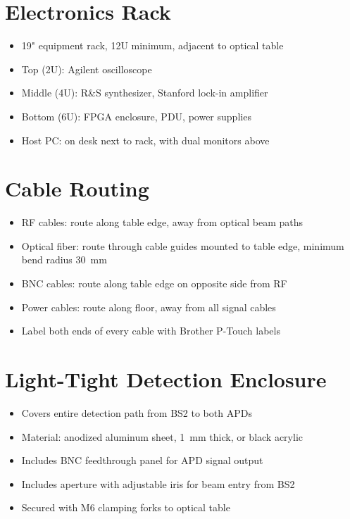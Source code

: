 \documentclass[11pt,a4paper,openany]{book}
\begin{document}
\section{Electronics Rack}

\begin{itemize}[nosep]
  \item 19" equipment rack, 12U minimum, adjacent to optical table
  \item Top (2U): Agilent oscilloscope
  \item Middle (4U): R\&S synthesizer, Stanford lock-in amplifier
  \item Bottom (6U): FPGA enclosure, PDU, power supplies
  \item Host PC: on desk next to rack, with dual monitors above
\end{itemize}

\section{Cable Routing}

\begin{itemize}[nosep]
  \item RF cables: route along table edge, away from optical beam paths
  \item Optical fiber: route through cable guides mounted to table edge, minimum bend radius 30~mm
  \item BNC cables: route along table edge on opposite side from RF
  \item Power cables: route along floor, away from all signal cables
  \item Label both ends of every cable with Brother P-Touch labels
\end{itemize}

\section{Light-Tight Detection Enclosure}

\begin{itemize}[nosep]
  \item Covers entire detection path from BS2 to both APDs
  \item Material: anodized aluminum sheet, 1~mm thick, or black acrylic
  \item Includes BNC feedthrough panel for APD signal output
  \item Includes aperture with adjustable iris for beam entry from BS2
  \item Secured with M6 clamping forks to optical table
\end{itemize}
\end{document}
